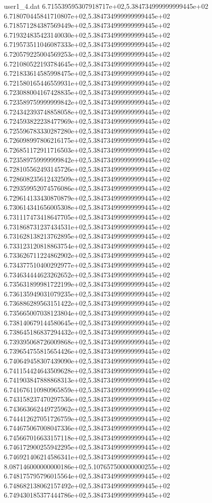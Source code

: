\begin{filecontents}{user1_4.dat}
6.715539595307918717e+02,5.384734999999999445e+02
6.718070445841710807e+02,5.384734999999999445e+02
6.718571284387569449e+02,5.384734999999999445e+02
6.719324835423140030e+02,5.384734999999999445e+02
6.719573511046087333e+02,5.384734999999999445e+02
6.720579225004569253e+02,5.384734999999999445e+02
6.721080522193784645e+02,5.384734999999999445e+02
6.721833614585998475e+02,5.384734999999999445e+02
6.721580165446559931e+02,5.384734999999999445e+02
6.723088004167428835e+02,5.384734999999999445e+02
6.723589759999999842e+02,5.384734999999999445e+02
6.724342393748858058e+02,5.384734999999999445e+02
6.724593822238477969e+02,5.384734999999999445e+02
6.725596783330287280e+02,5.384734999999999445e+02
6.726098997806216175e+02,5.384734999999999445e+02
6.726851172911716503e+02,5.384734999999999445e+02
6.723589759999999842e+02,5.384734999999999445e+02
6.728105562493145726e+02,5.384734999999999445e+02
6.728608235612432509e+02,5.384734999999999445e+02
6.729359952074576086e+02,5.384734999999999445e+02
6.729614133430870879e+02,5.384734999999999445e+02
6.730614341656005308e+02,5.384734999999999445e+02
6.731117473418647705e+02,5.384734999999999445e+02
6.731868731237434531e+02,5.384734999999999445e+02
6.731628138213762895e+02,5.384734999999999445e+02
6.733123120818863754e+02,5.384734999999999445e+02
6.733626711224862902e+02,5.384734999999999445e+02
6.734377510400292977e+02,5.384734999999999445e+02
6.734634444623262652e+02,5.384734999999999445e+02
6.735631899981722199e+02,5.384734999999999445e+02
6.736135949031079235e+02,5.384734999999999445e+02
6.736886289563151422e+02,5.384734999999999445e+02
6.735665007038123804e+02,5.384734999999999445e+02
6.738140679144580645e+02,5.384734999999999445e+02
6.738645186837294432e+02,5.384734999999999445e+02
6.739395068726009868e+02,5.384734999999999445e+02
6.739654755815654426e+02,5.384734999999999445e+02
6.740649458307439090e+02,5.384734999999999445e+02
6.741154424643509628e+02,5.384734999999999445e+02
6.741903847888868313e+02,5.384734999999999445e+02
6.741676110980965859e+02,5.384734999999999445e+02
6.743158237470297536e+02,5.384734999999999445e+02
6.743663662449725962e+02,5.384734999999999445e+02
6.744412627051726759e+02,5.384734999999999445e+02
6.744675067008047336e+02,5.384734999999999445e+02
6.745667016633157118e+02,5.384734999999999445e+02
6.746172900255942295e+02,5.384734999999999445e+02
6.746921406214586341e+02,5.384734999999999445e+02
8.087146000000000186e+02,5.107657500000000255e+02
6.748175795796015564e+02,5.384734999999999445e+02
6.748682138062157492e+02,5.384734999999999445e+02
6.749430185377444786e+02,5.384734999999999445e+02

\end{filecontents}
